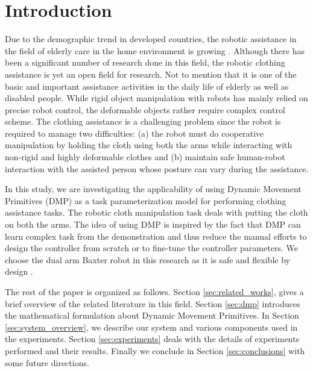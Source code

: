 \documentclass[sigconf]{acmart}
\begin{document}
\section{Introduction}
\label{sec:introduction}
Due to the demographic trend in developed countries, the robotic assistance in the field of elderly care in the home environment is growing \cite{broekens2009assistive}. Although there has been a significant number of research done in this field, the robotic clothing assistance is yet an open field for research. Not to mention that it is one of the basic and important assistance activities in the daily life of elderly as well as disabled people. While rigid object manipulation with robots has mainly relied on precise robot control, the deformable objects rather require complex control scheme. The clothing assistance is a challenging problem since the robot is required to manage two difficulties: (a) the robot must do cooperative manipulation by holding the cloth using both the arms while interacting with non-rigid and highly deformable clothes and (b) maintain safe human-robot interaction with the assisted person whose posture can vary during the assistance.

In this study, we are investigating the applicability of using Dynamic Movement Primitives (DMP) as a task parameterization model for performing clothing assistance tasks. The robotic cloth manipulation task deals with putting the cloth on both the arms. The idea of using DMP is inspired by the fact that DMP can learn complex task from the demonstration \cite{ijspeert2003learning, schaal2006dynamic, ijspeert2013dynamical} and thus reduce the manual efforts to design the controller from scratch or to fine-tune the controller parameters. We choose the dual arm Baxter robot in this research as it is safe and flexible by design \cite{fitzgerald2013developing}.

The rest of the paper is organized as follows. Section \ref{sec:related_works}, gives a brief overview of the related literature in this field. Section \ref{sec:dmp} introduces the mathematical formulation about Dynamic Movement Primitives. In Section \ref{sec:system_overview}, we describe our system and various components used in the experiments. Section \ref{sec:experiments} deals with the details of experiments performed and their results. Finally we conclude in Section \ref{sec:conclusions} with some future directions.
\end{document}
